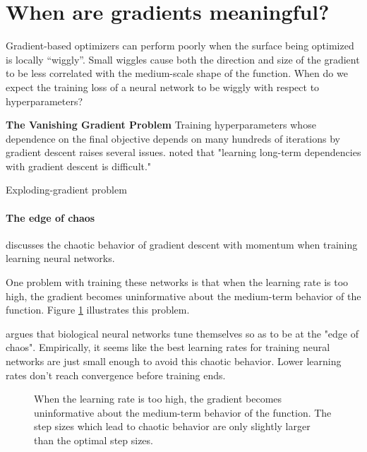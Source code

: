 \documentclass{article}
\begin{document}
\section{When are gradients meaningful?}

Gradient-based optimizers can perform poorly when the surface being optimized is locally ``wiggly''.
Small wiggles cause both the direction and size of the gradient to be less correlated with the medium-scale shape of the function.
When do we expect the training loss of a neural network to be wiggly with respect to hyperparameters?

\textbf{The Vanishing Gradient Problem}
Training hyperparameters whose dependence on the final objective depends on many hundreds of iterations by gradient descent raises several issues.
\citet{bengio1994learning} noted that "learning long-term dependencies with gradient descent is difficult."

Exploding-gradient problem~\cite{pascanu2012understanding}

\paragraph{The edge of chaos}
\citet*[Chapter 4]{pearlmutter1996investigation} discusses the chaotic behavior of gradient descent with momentum when training learning neural networks.

One problem with training these networks is that when the learning rate is too high, the gradient becomes uninformative about the medium-term behavior of the function.
Figure \ref{fig:chaos} illustrates this problem.

\cite{pearlmutter2009sleep} argues that biological neural networks tune themselves so as to be at the "edge of chaos".
Empirically, it seems like the best learning rates for training neural networks are just small enough to avoid this chaotic behavior.
Lower learning rates don't reach convergence before training ends.


\begin{figure}[h!]
\vskip 0.2in
\begin{center}
\caption{When the learning rate is too high, the gradient becomes uninformative about the medium-term behavior of the function.
The step sizes which lead to chaotic behavior are only slightly larger than the optimal step sizes.}
\label{fig:chaos}
\end{center}
\vskip -0.2in
\end{figure} 
\end{document}
